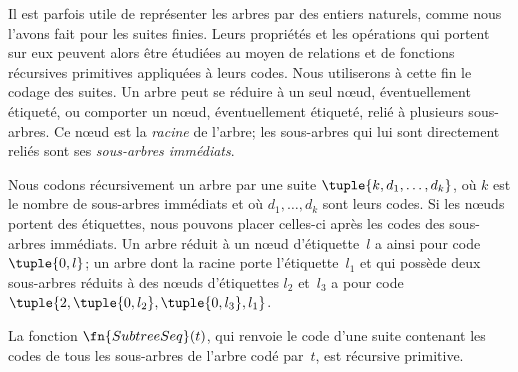 \documentclass[../../../include/open-logic-section]{subfiles}
\begin{document}

Il est parfois utile de représenter les arbres par des entiers
naturels, comme nous l'avons fait pour les suites finies. Leurs
propriétés et les opérations qui portent sur eux peuvent alors
être étudiées au moyen de relations et de fonctions récursives
primitives appliquées à leurs codes. Nous utiliserons à cette
fin le codage des suites. Un arbre peut se réduire à un seul
nœud, éventuellement étiqueté, ou comporter un nœud,
éventuellement étiqueté, relié à plusieurs sous-arbres.
Ce nœud est la \emph{racine} de l'arbre; les sous-arbres qui
lui sont directement reliés sont ses \emph{sous-arbres immédiats}.

Nous codons récursivement un arbre par une suite
$\tuple{k,d_1,\dots,d_k}$, où $k$ est le nombre de
sous-arbres immédiats et où $d_1,\dots,d_k$ sont leurs
codes. Si les nœuds portent des étiquettes, nous pouvons
placer celles-ci après les codes des sous-arbres immédiats.
Un arbre réduit à un nœud d'étiquette~$l$ a ainsi pour
code $\tuple{0,l}$; un arbre dont la racine porte
l'étiquette~$l_1$ et qui possède deux sous-arbres réduits
à des nœuds d'étiquettes $l_2$ et~$l_3$ a pour code
$\tuple{2,\tuple{0,l_2},\tuple{0,l_3},l_1}$.

\begin{prop}
  La fonction $\fn{SubtreeSeq}(t)$, qui renvoie le code
  d'une suite contenant les codes de tous les sous-arbres
  de l'arbre codé par~$t$, est récursive primitive.
\end{prop}
\end{document}
